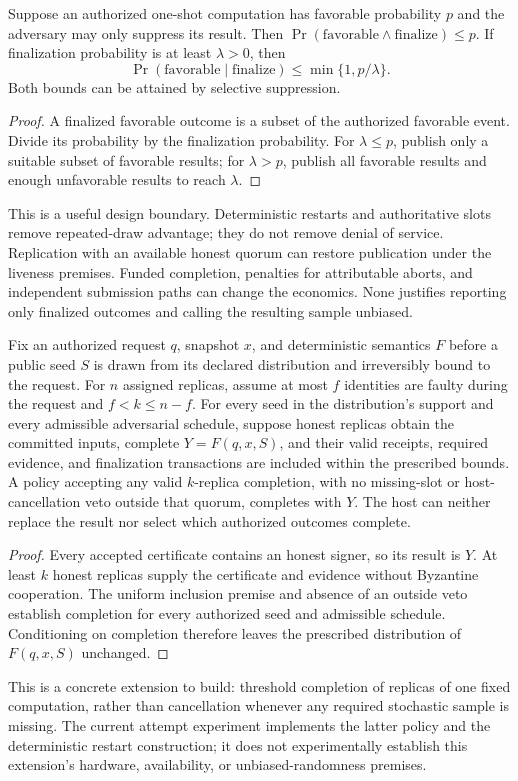 \begin{proposition}
Suppose an authorized one-shot computation has favorable probability $p$ and the adversary may only suppress its result. Then $\Pr(\mathrm{favorable}\land\mathrm{finalize})\leq p$. If finalization probability is at least $\lambda>0$, then
\[
\Pr(\mathrm{favorable}\mid\mathrm{finalize})\leq
\min\{1,p/\lambda\}.
\]
Both bounds can be attained by selective suppression.
\end{proposition}
\begin{proof}
A finalized favorable outcome is a subset of the authorized favorable event. Divide its probability by the finalization probability. For $\lambda\leq p$, publish only a suitable subset of favorable results; for $\lambda>p$, publish all favorable results and enough unfavorable results to reach $\lambda$.
\end{proof}

This is a useful design boundary. Deterministic restarts and authoritative slots remove repeated-draw advantage; they do not remove denial of service. Replication with an available honest quorum can restore publication under the liveness premises. Funded completion, penalties for attributable aborts, and independent submission paths can change the economics. None justifies reporting only finalized outcomes and calling the resulting sample unbiased.

\begin{proposition}
Fix an authorized request $q$, snapshot $x$, and deterministic semantics $F$ before a public seed $S$ is drawn from its declared distribution and irreversibly bound to the request. For $n$ assigned replicas, assume at most $f$ identities are faulty during the request and $f<k\leq n-f$. For every seed in the distribution's support and every admissible adversarial schedule, suppose honest replicas obtain the committed inputs, complete $Y=F(q,x,S)$, and their valid receipts, required evidence, and finalization transactions are included within the prescribed bounds. A policy accepting any valid $k$-replica completion, with no missing-slot or host-cancellation veto outside that quorum, completes with $Y$. The host can neither replace the result nor select which authorized outcomes complete.
\end{proposition}
\begin{proof}
Every accepted certificate contains an honest signer, so its result is $Y$. At least $k$ honest replicas supply the certificate and evidence without Byzantine cooperation. The uniform inclusion premise and absence of an outside veto establish completion for every authorized seed and admissible schedule. Conditioning on completion therefore leaves the prescribed distribution of $F(q,x,S)$ unchanged.
\end{proof}

This is a concrete extension to build: threshold completion of replicas of one fixed computation, rather than cancellation whenever any required stochastic sample is missing. The current attempt experiment implements the latter policy and the deterministic restart construction; it does not experimentally establish this extension's hardware, availability, or unbiased-randomness premises.
